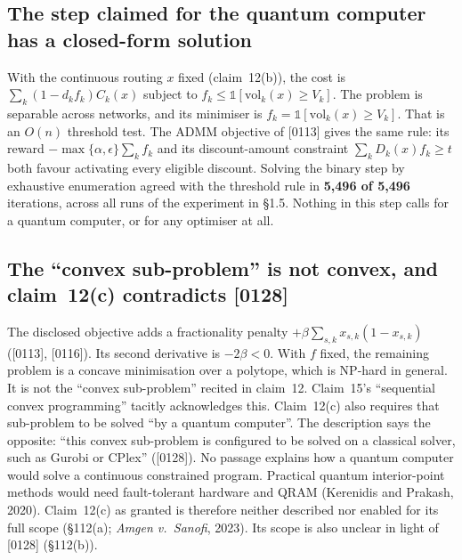 \documentclass[10pt,a4paper]{article}
\begin{document}
\subsection{The step claimed for the quantum computer has a closed-form solution}
With the continuous routing $x$ fixed (claim~12(b)), the cost is $\sum_k (1-d_kf_k)C_k(x)$ subject to $f_k\le \mathbb{1}[\mathrm{vol}_k(x)\ge V_k]$. The problem is separable across networks, and its minimiser is $f_k=\mathbb{1}[\mathrm{vol}_k(x)\ge V_k]$. That is an $O(n)$ threshold test. The ADMM objective of [0113] gives the same rule: its reward $-\max\{\alpha,\epsilon\}\sum_k f_k$ and its discount-amount constraint $\sum_k D_k(x)f_k\ge t$ both favour activating every eligible discount. Solving the binary step by exhaustive enumeration agreed with the threshold rule in \textbf{5,496 of 5,496} iterations, across all runs of the experiment in \S1.5. Nothing in this step calls for a quantum computer, or for any optimiser at all.

\subsection{The ``convex sub-problem'' is not convex, and claim~12(c) contradicts [0128]}
The disclosed objective adds a fractionality penalty $+\beta\sum_{s,k}x_{s,k}(1-x_{s,k})$ ([0113], [0116]). Its second derivative is $-2\beta<0$. With $f$ fixed, the remaining problem is a concave minimisation over a polytope, which is NP-hard in general. It is not the ``convex sub-problem'' recited in claim~12. Claim~15's ``sequential convex programming'' tacitly acknowledges this. Claim~12(c) also requires that sub-problem to be solved ``by a quantum computer''. The description says the opposite: ``this convex sub-problem is configured to be solved on a classical solver, such as Gurobi or CPlex'' ([0128]). No passage explains how a quantum computer would solve a continuous constrained program. Practical quantum interior-point methods would need fault-tolerant hardware and QRAM (Kerenidis and Prakash, 2020). Claim~12(c) as granted is therefore neither described nor enabled for its full scope (\S112(a); \emph{Amgen v.\ Sanofi}, 2023). Its scope is also unclear in light of [0128] (\S112(b)).
\end{document}
